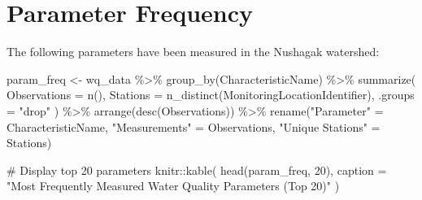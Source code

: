 \documentclass[
  letterpaper,
]{scrbook}
\newenvironment{Shaded}{\begin{snugshade}}{\end{snugshade}}
\newcommand{\AttributeTok}[1]{\textcolor[rgb]{0.40,0.45,0.13}{#1}}
\newcommand{\CommentTok}[1]{\textcolor[rgb]{0.37,0.37,0.37}{#1}}
\newcommand{\DecValTok}[1]{\textcolor[rgb]{0.68,0.00,0.00}{#1}}
\newcommand{\FunctionTok}[1]{\textcolor[rgb]{0.28,0.35,0.67}{#1}}
\newcommand{\NormalTok}[1]{\textcolor[rgb]{0.00,0.23,0.31}{#1}}
\newcommand{\OtherTok}[1]{\textcolor[rgb]{0.00,0.23,0.31}{#1}}
\newcommand{\SpecialCharTok}[1]{\textcolor[rgb]{0.37,0.37,0.37}{#1}}
\newcommand{\StringTok}[1]{\textcolor[rgb]{0.13,0.47,0.30}{#1}}
\begin{document}
\section{Parameter Frequency}\label{parameter-frequency}

The following parameters have been measured in the Nushagak watershed:

\begin{Shaded}
\begin{Highlighting}[]
\NormalTok{param\_freq }\OtherTok{\textless{}{-}}\NormalTok{ wq\_data }\SpecialCharTok{\%\textgreater{}\%}
  \FunctionTok{group\_by}\NormalTok{(CharacteristicName) }\SpecialCharTok{\%\textgreater{}\%}
  \FunctionTok{summarize}\NormalTok{(}
    \AttributeTok{Observations =} \FunctionTok{n}\NormalTok{(),}
    \AttributeTok{Stations =} \FunctionTok{n\_distinct}\NormalTok{(MonitoringLocationIdentifier),}
    \AttributeTok{.groups =} \StringTok{"drop"}
\NormalTok{  ) }\SpecialCharTok{\%\textgreater{}\%}
  \FunctionTok{arrange}\NormalTok{(}\FunctionTok{desc}\NormalTok{(Observations)) }\SpecialCharTok{\%\textgreater{}\%}
  \FunctionTok{rename}\NormalTok{(}\StringTok{"Parameter"} \OtherTok{=}\NormalTok{ CharacteristicName, }\StringTok{"Measurements"} \OtherTok{=}\NormalTok{ Observations, }\StringTok{"Unique Stations"} \OtherTok{=}\NormalTok{ Stations)}

\CommentTok{\# Display top 20 parameters}
\NormalTok{knitr}\SpecialCharTok{::}\FunctionTok{kable}\NormalTok{(}
  \FunctionTok{head}\NormalTok{(param\_freq, }\DecValTok{20}\NormalTok{),}
  \AttributeTok{caption =} \StringTok{"Most Frequently Measured Water Quality Parameters (Top 20)"}
\NormalTok{)}
\end{Highlighting}
\end{Shaded}
\end{document}
